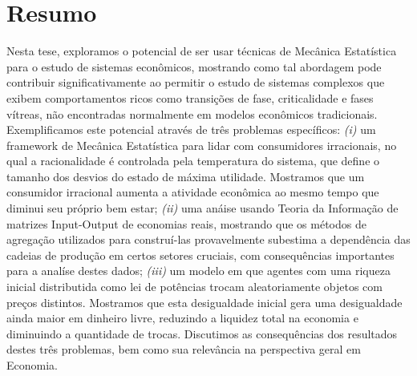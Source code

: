 \chapter*{Resumo}

Nesta tese, exploramos o potencial de ser usar técnicas de Mecânica Estatística para o estudo de sistemas econômicos, mostrando como tal abordagem pode contribuir significativamente ao permitir o estudo de sistemas complexos que exibem comportamentos ricos como transições de fase, criticalidade e fases vítreas, não encontradas normalmente em modelos econômicos tradicionais. Exemplificamos este potencial através de três problemas específicos: \textit{(i)} um framework de Mecânica Estatística para lidar com consumidores irracionais, no qual a racionalidade é controlada pela temperatura do sistema, que define o tamanho dos desvios do estado de máxima utilidade. Mostramos que um consumidor irracional aumenta a atividade econômica ao mesmo tempo que diminui seu próprio bem estar; \textit{(ii)} uma anáise usando Teoria da Informação de matrizes Input-Output de economias reais, mostrando que os métodos de agregação utilizados para construí-las provavelmente subestima a dependência das cadeias de produção em certos setores cruciais, com consequências importantes para a analíse destes dados; \textit{(iii)} um modelo em que agentes com uma riqueza inicial distributida como lei de potências trocam aleatoriamente objetos com preços distintos. Mostramos que esta desigualdade inicial gera uma desigualdade ainda maior em dinheiro livre, reduzindo a liquidez total na economia e diminuindo a quantidade de trocas. Discutimos as consequências dos resultados destes três problemas, bem como sua relevância na perspectiva geral em Economia.